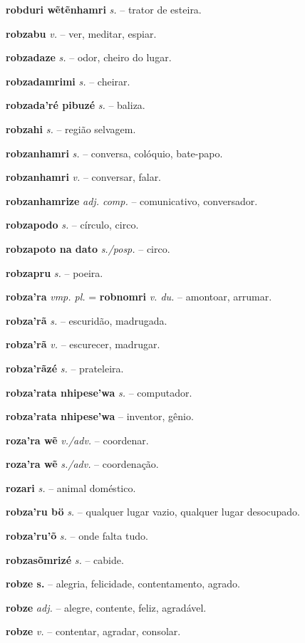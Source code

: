 \textbf{robduri wẽtẽnhamri} \textit{s.} -- trator de esteira.

\textbf{robzabu} \textit{v.} -- ver, meditar, espiar.

\textbf{robzadaze} \textit{s.} -- odor, cheiro do lugar.

\textbf{robzadamrimi} \textit{s.} -- cheirar.

\textbf{robzada'ré pibuzé} \textit{s.} -- baliza.

\textbf{robzahi} \textit{s.} -- região selvagem.

\textbf{robzanhamri} \textit{s.} -- conversa, colóquio, bate-papo.

\textbf{robzanhamri} \textit{v.} -- conversar, falar.

\textbf{robzanhamrize} \textit{adj. comp.} -- comunicativo, conversador.

\textbf{robzapodo} \textit{s.} -- círculo, circo.

\textbf{robzapoto na dato} \textit{s./posp.} -- circo.

\textbf{robzapru} \textit{s.} -- poeira.

\textbf{robza'ra} \textit{vmp. pl.} = \textbf{robnomri} \textit{v. du.} -- amontoar, arrumar.

\textbf{robza'rã} \textit{s.} -- escuridão, madrugada.

\textbf{robza'rã} \textit{v.} -- escurecer, madrugar.

\textbf{robza'rãzé} \textit{s.} -- prateleira.

\textbf{robza'rata nhipese'wa} \textit{s.} -- computador.

\textbf{robza'rata nhipese'wa} \textit{} -- inventor, gênio.

\textbf{roza'ra wẽ} \textit{v./adv.} -- coordenar.

\textbf{roza'ra wẽ} \textit{s./adv.} -- coordenação.

\textbf{rozari} \textit{s.} -- animal doméstico.

\textbf{robza'ru bö} \textit{s.} -- qualquer lugar vazio, qualquer lugar desocupado.

\textbf{robza'ru'õ} \textit{s.} -- onde falta tudo.

\textbf{robzasõmrizé} \textit{s.} -- cabide.

\textbf{robze s.} -- alegria, felicidade, contentamento, agrado.

\textbf{robze} \textit{adj.} -- alegre, contente, feliz, agradável.

\textbf{robze} \textit{v.} -- contentar, agradar, consolar.

